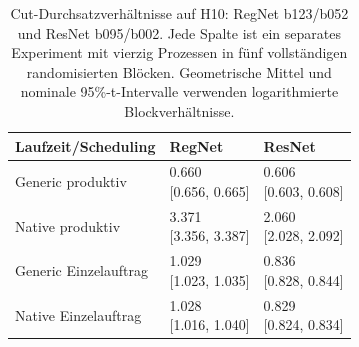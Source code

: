 \begin{table}[t]
\centering
\caption{Cut-Durchsatzverhältnisse auf H10: RegNet b123/b052 und ResNet b095/b002. Jede Spalte ist ein separates Experiment mit vierzig Prozessen in fünf vollständigen randomisierten Blöcken. Geometrische Mittel und nominale 95\%-t-Intervalle verwenden logarithmierte Blockverhältnisse.}
\label{tab:scheduling}
\begingroup\small\setlength{\tabcolsep}{3pt}
\begin{tabular}{lll}
\toprule
Laufzeit/Scheduling & RegNet & ResNet \\
\midrule
Generic produktiv & \shortstack{{0.660}\\{[0.656, 0.665]}} & \shortstack{{0.606}\\{[0.603, 0.608]}} \\
Native produktiv & \shortstack{{3.371}\\{[3.356, 3.387]}} & \shortstack{{2.060}\\{[2.028, 2.092]}} \\
Generic Einzelauftrag & \shortstack{{1.029}\\{[1.023, 1.035]}} & \shortstack{{0.836}\\{[0.828, 0.844]}} \\
Native Einzelauftrag & \shortstack{{1.028}\\{[1.016, 1.040]}} & \shortstack{{0.829}\\{[0.824, 0.834]}} \\
\bottomrule
\end{tabular}
\endgroup
\end{table}
